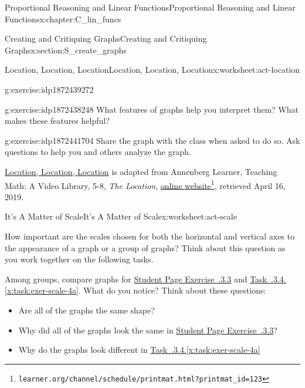 \documentclass[oneside,10pt,]{book}
\newcommand{\xreffont}{\relax}
\newcommand{\pubtitle}[1]{\textsl{#1}}
\numberwithin{equation}{chapter}
\begin{document}
\begin{chapterptx}{Proportional Reasoning and Linear Functions}{}{Proportional Reasoning and Linear Functions}{}{}{x:chapter:C_lin_funcs}
\begin{sectionptx}{Creating and Critiquing Graphs}{}{Creating and Critiquing Graphs}{}{}{x:section:S_create_graphs}
\begin{worksheet-subsection}{Location, Location, Location}{}{Location, Location, Location}{}{}{x:worksheet:act-location}
\begin{divisionexercise}{4}{}{}{g:exercise:idp1872439272}
\end{divisionexercise}%
\begin{divisionexercise}{5}{}{}{g:exercise:idp1872438248}%
What features of graphs help you interpret them? What makes these features helpful?%
\end{divisionexercise}%
\begin{divisionexercise}{6}{}{}{g:exercise:idp1872441704}%
Share the graph with the class when asked to do so. Ask questions to help you and others analyze the graph.%
\end{divisionexercise}%
\begin{conclusion}{}%
\hyperref[x:worksheet:act-location]{Location, Location, Location} is adapted from Annenberg Learner, Teaching Math: A Video Library, 5-8, \pubtitle{The Location}, \href{http://www.learner.org/channel/schedule/printmat.html?printmat_id=123}{online website}\footnote{\nolinkurl{learner.org/channel/schedule/printmat.html?printmat_id=123}\label{g:fn:idp1872442984}}, retrieved April 16, 2019.%
\end{conclusion}%
\end{worksheet-subsection}
\restoregeometry
%
%
\typeout{************************************************}
\typeout{************************************************}
%
\begin{worksheet-subsection}{It's A Matter of Scale}{}{It's A Matter of Scale}{}{}{x:worksheet:act-scale}
\begin{introduction}{}%
How important are the scales chosen for both the horizontal and vertical axes to the appearance of a graph or a group of graphs? Think about this question as you work together on the following tasks.%
\par
Among groups, compare graphs for \hyperlink{x:exercise:exer-scale-3}{Student Page Exercise~{\xreffont 2.2.3.3}} and \hyperref[x:task:exer-scale-4a]{Task~{\xreffont 2.2.3.4}.{\xreffont\ref{x:task:exer-scale-4a}}}. What do you notice? Think about these questions:%
\begin{itemize}[label=\textbullet]
\item{}Are all of the graphs the same shape?%
\item{}Why did all of the graphs look the same in \hyperlink{x:exercise:exer-scale-3}{Student Page Exercise~{\xreffont 2.2.3.3}}?%
\item{}Why do the graphs look different in \hyperref[x:task:exer-scale-4a]{Task~{\xreffont 2.2.3.4}.{\xreffont\ref{x:task:exer-scale-4a}}}%

\end{itemize}
\end{introduction}
\end{worksheet-subsection}
\end{sectionptx}
\end{chapterptx}
\end{document}

